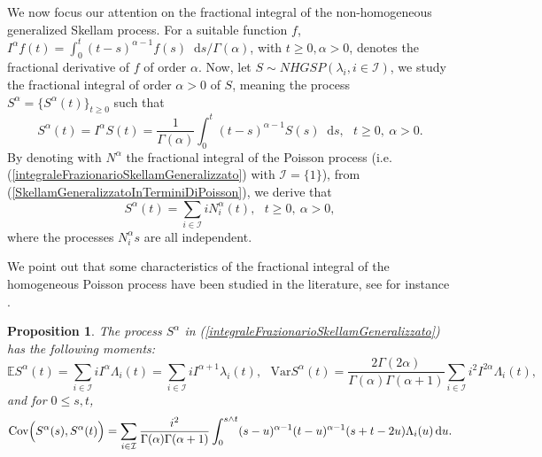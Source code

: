\documentclass[12pt, twoside, english, headsepline]{article}
\newcommand*\dif{\mathop{}\!\mathrm{d}}  %
\newtheorem{proposition}{Proposition}[section] %
\theoremstyle{definition} %
\numberwithin{equation}{section} %
\begin{document}
We now focus our attention on the fractional integral of the non-homogeneous generalized Skellam process. For a suitable function $f$, $I^\alpha f(t) = \int_0^t (t-s)^{\alpha - 1} f(s)\dif s/ \Gamma(\alpha)$, with $t\ge0, \alpha>0$, denotes the fractional derivative of $f$ of order $\alpha$. Now, let $S\sim NHGSP (\lambda_i, i\in \mathcal{I} )$, we study the fractional integral of order $\alpha>0$ of $S$, meaning the process $S^\alpha = \big\{S^\alpha(t)\big\}_{t\ge0}$ such that
\begin{equation}\label{integraleFrazionarioSkellamGeneralizzato}
S^\alpha (t) = I^\alpha S(t) =  \frac{1}{\Gamma(\alpha)} \int_0^t (t-s)^{\alpha-1} S(s)\dif s,\ \ \ t\ge0,\ \alpha>0.
\end{equation}
By denoting with $N^\alpha$ the fractional integral of the Poisson process (i.e. (\ref{integraleFrazionarioSkellamGeneralizzato}) with $\mathcal{I} = \{1\}$), from (\ref{SkellamGeneralizzatoInTerminiDiPoisson}), we derive that 
\begin{equation}\label{integraleSkellamGeneralizzatoInTerminiDiPoisson}
S^{\alpha}(t) = \sum_{i\in\mathcal{I}} i N_i^\alpha(t),\ \ \ t\ge0,\ \alpha>0,
\end{equation}
where the processes $N_i^\alpha s$ are all independent.

We point out that some characteristics of the fractional integral of the homogeneous Poisson process have been studied in the literature, see for instance \cite{OP2013}.

\begin{proposition}
The process $S^\alpha$ in (\ref{integraleFrazionarioSkellamGeneralizzato}) has the following moments:
\begin{equation}\label{momentiPrimoSecondoIntegraleSkellamGeneralizzatoNonOmogeneo}
\mathbb{E}S^\alpha(t) = \sum_{i\in\mathcal{I}} i I^\alpha \Lambda_i(t) =  \sum_{i\in\mathcal{I}} i I^{\alpha+1} \lambda_i(t), \ \ \  \text{Var}S^\alpha(t) = \frac{2\Gamma(2\alpha)}{\Gamma(\alpha)\Gamma(\alpha+1)}\sum_{i\in\mathcal{I}} i^2 I^{2\alpha}\Lambda_i(t),  
\end{equation} 
and for $0\le s,t$,
\begin{equation}\label{covarianzaIntegraleSkellamGeneralizzato}
 \text{Cov}\Bigl( S^\alpha(s),S^\alpha(t)\Bigr) = \sum_{i\in\mathcal{I}} \frac{i^2}{\Gamma(\alpha)\Gamma(\alpha+1)}\int_0^{s\wedge t} (s-u)^{\alpha-1}(t-u)^{\alpha-1}(s+t-2u)\Lambda_{i}(u)\dif u.
\end{equation}
\end{proposition}
\end{document}
